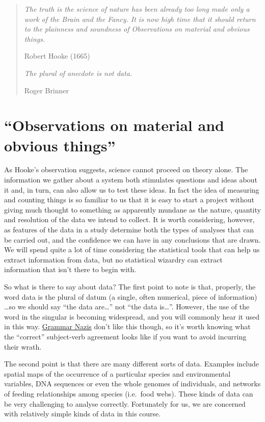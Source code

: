 \documentclass[]{book}
\begin{document}
\begin{quote}
\emph{The truth is the science of nature has been already too long made
only a work of the Brain and the Fancy. It is now high time that it
should return to the plainness and soundness of Observations on material
and obvious things.}

Robert Hooke (1665)

\emph{The plural of anecdote is not data.}

Roger Brinner
\end{quote}

\section{\texorpdfstring{``Observations on material and obvious
things''}{Observations on material and obvious things}}\label{observations-on-material-and-obvious-things}

As Hooke's observation suggests, science cannot proceed on theory alone.
The information we gather about a system both stimulates questions and
ideas about it and, in turn, can also allow us to test these ideas. In
fact the idea of measuring and counting things is so familiar to us that
it is easy to start a project without giving much thought to something
as apparently mundane as the nature, quantity and resolution of the data
we intend to collect. It is worth considering, however, as features of
the data in a study determine both the types of analyses that can be
carried out, and the confidence we can have in any conclusions that are
drawn. We will spend quite a lot of time considering the statistical
tools that can help us extract information from data, but no statistical
wizardry can extract information that isn't there to begin with.

So what is there to say about data? The first point to note is that,
properly, the word data is the plural of datum (a single, often
numerical, piece of information) \ldots{}so we should say ``the data
are\ldots{}'' not ``the data is\ldots{}''. However, the use of the word
in the singular is becoming widespread, and you will commonly hear it
used in this way.
\href{http://www.urbandictionary.com/define.php?term=Grammar\%20Nazi}{Grammar
Nazis} don't like this though, so it's worth knowing what the
``correct'' subject-verb agreement looks like if you want to avoid
incurring their wrath.

The second point is that there are many different sorts of data.
Examples include spatial maps of the occurrence of a particular species
and environmental variables, DNA sequences or even the whole genomes of
individuals, and networks of feeding relationships among species
(i.e.~food webs). These kinds of data can be very challenging to analyse
correctly. Fortunately for us, we are concerned with relatively simple
kinds of data in this course.
\end{document}
